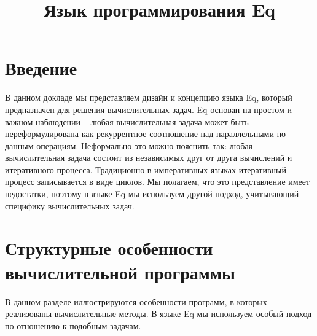 \documentclass[a4paper]{llncs}
\title{Язык программирования Eq}
\institute{}
\author{}
\begin{document}
\maketitle
\section*{Введение}
В данном докладе мы представляем дизайн и концепцию языка Eq, который
предназначен для решения вычислительных задач. Eq основан на простом и важном
наблюдении -- любая вычислительная задача может быть переформулирована как
рекуррентное соотношение над параллельными по данным операциям. Неформально это
можно пояснить так: любая вычислительная задача состоит из независимых друг от
друга вычислений и итеративного процесса. Традиционно в императивных языках
итеративный процесс записывается в виде циклов. Мы полагаем, что это
представление имеет недостатки, поэтому в языке Eq мы используем другой подход,
учитывающий специфику вычислительных задач.

\section*{Структурные особенности вычислительной программы}
В данном разделе иллюстрируются особенности программ, в которых реализованы
вычислительные методы. В языке Eq мы используем особый подход по отношению к
подобным задачам.
\end{document}
